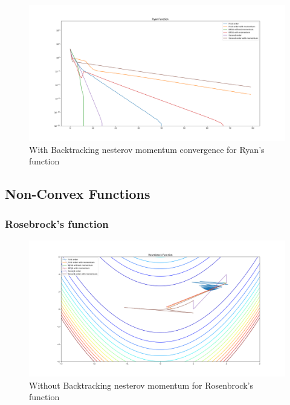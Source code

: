 \documentclass{article}
\begin{document}
\begin{figure}[H]
	\includegraphics[width=\linewidth]{../Images/ryanbacktrack1.png}
	\caption{With Backtracking nesterov momentum convergence for Ryan's function}
	\label{fig:With Backtracking nesterov momentum convergence for Ryan's function}
\end{figure}
		
\subsection{Non-Convex Functions}

\subsubsection{Rosebrock's function}
\begin{figure}[H]
	\includegraphics[width=\linewidth]{../Images/rosenbrocknesterov.png}
	\caption{Without Backtracking nesterov momentum for Rosenbrock's function}
	\label{fig:Without Backtracking nesterov momentum for Rosenbrock's function}
\end{figure}
\end{document}
